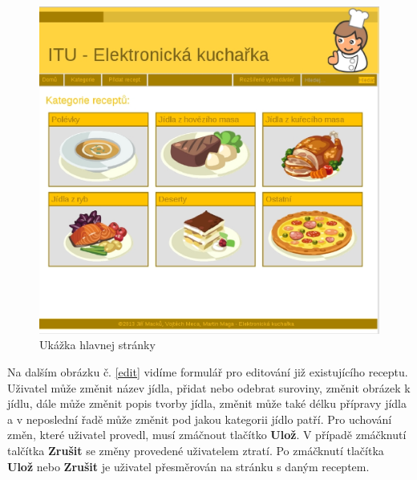 \documentclass[12pt,a4paper,titlepage,final]{article}
\begin{document}
\begin{figure}

\begin{center}

\includegraphics[scale=0.7]{img/home.eps} 
\caption{Ukážka hlavnej stránky}
\label{koncept}

\end{center}

\end{figure}

Na dalším obrázku č. \ref{edit} vidíme formulář pro editování již existujícího receptu. Uživatel může změnit název jídla, přidat nebo odebrat suroviny, změnit obrázek k jídlu, dále může změnit popis tvorby jídla, změnit může také délku přípravy jídla a v neposlední řadě může změnit pod jakou kategorii jídlo patří. Pro uchování změn, které uživatel provedl, musí zmáčnout tlačítko \textbf{Ulož}. V případě zmáčknutí talčítka \textbf{Zrušit} se změny provedené uživatelem ztratí. Po zmáčknutí tlačítka \textbf{Ulož} nebo \textbf{Zrušit} je uživatel přesměrován na stránku s daným receptem.\newline
\end{document}
